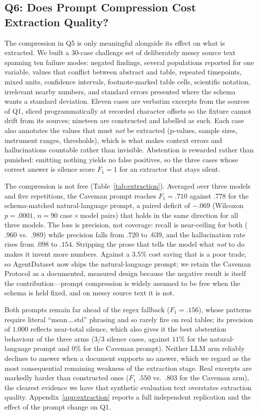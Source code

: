 \subsection{Q6: Does Prompt Compression Cost Extraction Quality?}
The compression in Q5 is only meaningful alongside its effect on what is
extracted. We built a 30-case challenge set of deliberately messy source text
spanning ten failure modes: negated findings, several populations reported for
one variable, values that conflict between abstract and table, repeated
timepoints, mixed units, confidence intervals, footnote-marked table cells,
scientific notation, irrelevant nearby numbers, and standard errors presented
where the schema wants a standard deviation. Eleven cases are verbatim excerpts
from the sources of Q1, sliced programmatically at recorded character offsets so
the fixture cannot drift from its sources; nineteen are constructed and labelled
as such. Each case also annotates the values that must \emph{not} be extracted
(p-values, sample sizes, instrument ranges, thresholds), which is what makes
context errors and hallucinations countable rather than invisible. Abstention is
rewarded rather than punished: emitting nothing yields no false positives, so the
three cases whose correct answer is silence score $F_1{=}1$ for an extractor that
stays silent.

The compression is not free (Table~\ref{tab:extraction}). Averaged over three
models and five repetitions, the Caveman prompt reaches $F_1=.710$ against $.778$
for the schema-matched natural-language prompt, a paired deficit of $-.069$
(Wilcoxon $p=.0001$, $n=90$ case\,$\times$\,model pairs) that holds in the same
direction for all three models. The loss is precision, not coverage: recall is
near-ceiling for both ($.960$ vs.\ $.989$) while precision falls from $.720$ to
$.639$, and the hallucination rate rises from $.098$ to $.154$. Stripping the
prose that tells the model what \emph{not} to do makes it invent more numbers.
Against a $3.5\%$ cost saving that is a poor trade, so AgentDataset now ships the
natural-language prompt; we retain the Caveman Protocol as a documented, measured
design because the negative result is itself the contribution---prompt
compression is widely assumed to be free when the schema is held fixed, and on
messy source text it is not.

Both prompts remain far ahead of the regex fallback ($F_1=.156$), whose patterns
require literal ``mean\,\ldots\,std'' phrasing and so rarely fire on real tables;
its precision of $1.000$ reflects near-total silence, which also gives it the best
abstention behaviour of the three arms ($3/3$ silence cases, against $11\%$ for
the natural-language prompt and $0\%$ for the Caveman prompt). Neither LLM arm
reliably declines to answer when a document supports no answer, which we regard
as the most consequential remaining weakness of the extraction stage. Real
excerpts are markedly harder than constructed ones ($F_1$ $.550$ vs.\ $.803$ for
the Caveman arm), the clearest evidence we have that synthetic evaluation text
overstates extraction quality. Appendix~\ref{app:extraction} reports a full
independent replication and the effect of the prompt change on Q1.

